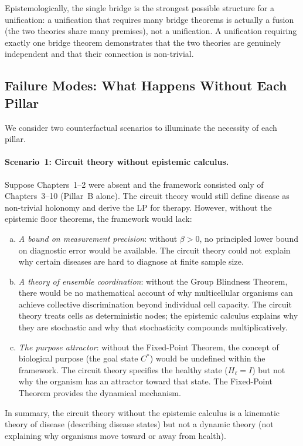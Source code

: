 Epistemologically, the single bridge is the strongest possible structure for a
unification: a unification that requires many bridge theorems is actually a
fusion (the two theories share many premises), not a unification.  A
unification requiring exactly one bridge theorem demonstrates that the two
theories are genuinely independent and that their connection is non-trivial.

\subsection{Failure Modes: What Happens Without Each Pillar}
\label{subsec:ch11-failure-modes}

We consider two counterfactual scenarios to illuminate the necessity of each
pillar.

\paragraph{Scenario~1: Circuit theory without epistemic calculus.}
Suppose Chapters~1--2 were absent and the framework consisted only of
Chapters~3--10 (Pillar~B alone).  The circuit theory would still define
disease as non-trivial holonomy and derive the LP for therapy.  However,
without the epistemic floor theorems, the framework would lack:
\begin{enumerate}[(a)]
  \item \emph{A bound on measurement precision}: without $\beta > 0$, no
    principled lower bound on diagnostic error would be available.  The circuit
    theory could not explain why certain diseases are hard to diagnose at
    finite sample size.
  \item \emph{A theory of ensemble coordination}: without the Group Blindness
    Theorem, there would be no mathematical account of why multicellular
    organisms can achieve collective discrimination beyond individual cell
    capacity.  The circuit theory treats cells as deterministic nodes; the
    epistemic calculus explains why they are stochastic and why that
    stochasticity compounds multiplicatively.
  \item \emph{The purpose attractor}: without the Fixed-Point Theorem, the
    concept of biological purpose (the goal state $C^*$) would be undefined
    within the framework.  The circuit theory specifies the healthy state
    ($H_\ell = I$) but not why the organism has an attractor toward that
    state.  The Fixed-Point Theorem provides the dynamical mechanism.
\end{enumerate}
In summary, the circuit theory without the epistemic calculus is a kinematic
theory of disease (describing disease states) but not a dynamic theory
(not explaining why organisms move toward or away from health).

